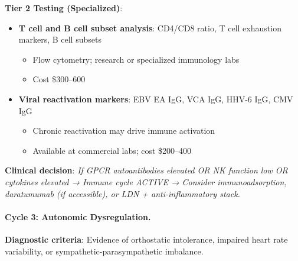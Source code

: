 \textbf{Tier 2 Testing (Specialized)}:
\begin{itemize}
    \item \textbf{T cell and B cell subset analysis}: CD4/CD8 ratio, T cell exhaustion markers, B cell subsets
    \begin{itemize}
        \item Flow cytometry; research or specialized immunology labs
        \item Cost \$300--600
    \end{itemize}

    \item \textbf{Viral reactivation markers}: EBV EA IgG, VCA IgG, HHV-6 IgG, CMV IgG
    \begin{itemize}
        \item Chronic reactivation may drive immune activation
        \item Available at commercial labs; cost \$200--400
    \end{itemize}
\end{itemize}

\textbf{Clinical decision}: \textit{If GPCR autoantibodies elevated OR NK function low OR cytokines elevated → Immune cycle ACTIVE → Consider immunoadsorption, daratumumab (if accessible), or LDN + anti-inflammatory stack.}

\paragraph{Cycle 3: Autonomic Dysregulation.}

\textbf{Diagnostic criteria}: Evidence of orthostatic intolerance, impaired heart rate variability, or sympathetic-parasympathetic imbalance.

